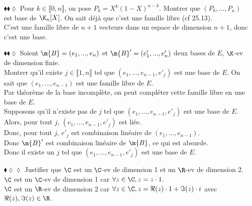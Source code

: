 \documentclass[11pt]{article}
\begin{document}
\begin{exercice}{$\blacklozenge\blacklozenge\lozenge$}{}
    Pour $k\in\llbracket0,n\rrbracket$, on pose $P_k = X^k(1-X)^{n-k}$. Montrer que $(P_0, ..., P_n)$ est base de $\K_n[X]$.
    \tcblower
    On sait déjà que c'est une famille libre (cf 25.13).\\
    C'est une famille libre de $n+1$ vecteurs dans un espace de dimension $n+1$, donc c'est une base.
\end{exercice}

\begin{exercice}{$\blacklozenge\blacklozenge\lozenge$}{}
    Soient $\m{B}=(e_1, ..., e_n)$ et $\m{B}'=(e'_1,...,e'_n)$ deux bases de $E$, $\K$-ev de dimension finie.\\
    Montrer qu'il existe $j\in\llbracket1,n\rrbracket$ tel que $(e_1, ..., e_{n-1}, e'_j)$ est une base de $E$.
    \tcblower
    On sait que $(e_1, ..., e_{n-1})$ est une famille libre de $E$.\\
    Par théorème de la base incomplète, on peut compléter cette famille libre en une base de $E$.\\
    Supposons qu'il n'existe pas de $j$ tel que $(e_1, ..., e_{n-1}, e'_j)$ est une base de $E$.\\
    Alors, pour tout $j$, $(e_1, ..., e_{n-1}, e'_j)$ est liée.\\
    Donc, pour tout $j$, $e'_j$ est combinaison linéaire de $(e_1, ..., e_{n-1})$.\\
    Donc $\m{B}'$ est combinaison linéaire de $\m{B}$, ce qui est absurde.\\
    Donc il existe un $j$ tel que $(e_1, ..., e_{n-1}, e'_j)$ est une base de $E$.
\end{exercice}

\begin{exercice}{$\blacklozenge\lozenge\lozenge$}{}
    Justifier que $\C$ est un $\C$-ev de dimension 1 et un $\R$-ev de dimension 2.
    \tcblower
    $\C$ est un $\C$-ev de dimension 1 car $\forall z \in \C, z = z \cdot 1$.\\
    $\C$ est un $\R$-ev de dimension 2 car $\forall z \in \C, z = \Re(z) \cdot 1 + \Im(z) \cdot i$ avec $\Re(z), \Im(z) \in \R$.
\end{exercice}
\end{document}
